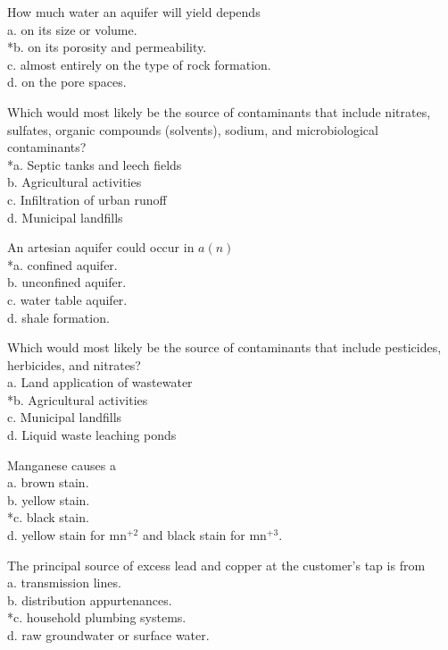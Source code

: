   \item How much water an aquifer will yield depends\\
a. on its size or volume.\\
*b. on its porosity and permeability.\\
c. almost entirely on the type of rock formation.\\
d. on the pore spaces.\\

  \item Which would most likely be the source of contaminants that include nitrates, sulfates, organic compounds (solvents), sodium, and microbiological contaminants?\\
*a. Septic tanks and leech fields\\
b. Agricultural activities\\
c. Infiltration of urban runoff\\
d. Municipal landfills\\

  \item An artesian aquifer could occur in $a(n)$\\
*a. confined aquifer.\\
b. unconfined aquifer.\\
c. water table aquifer.\\
d. shale formation.\\

  \item Which would most likely be the source of contaminants that include pesticides, herbicides, and nitrates?\\
a. Land application of wastewater\\
*b. Agricultural activities\\
c. Municipal landfills\\
d. Liquid waste leaching ponds\\

  \item Manganese causes a\\
a. brown stain.\\
b. yellow stain.\\
*c. black stain.\\
d. yellow stain for $\mathrm{mn}^{+2}$ and black stain for $\mathrm{mn}^{+3}$.\\

  \item The principal source of excess lead and copper at the customer's tap is from\\
a. transmission lines.\\
b. distribution appurtenances.\\
*c. household plumbing systems.\\
d. raw groundwater or surface water.

